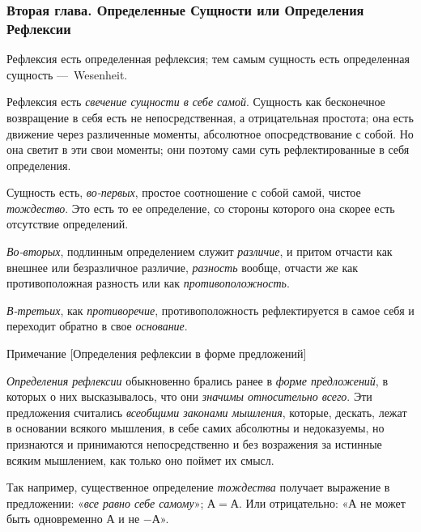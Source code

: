 \subsubsection{Вторая глава. Определенные Сущности или Определения Рефлексии}
Рефлексия есть определенная рефлексия; тем самым
сущность есть определенная сущность —~Wesenheit.

Рефлексия есть {\em свечение сущности в себе самой}.
Сущность как бесконечное возвращение в себя есть не непосредственная, а
отрицательная простота; она есть движение через различенные моменты,
абсолютное опосредствование с собой. Но она светит в эти свои моменты; они
поэтому сами суть рефлектированные в себя определения.

Сущность есть, {\em во-первых}, простое соотношение с
собой самой, чистое {\em тождество}. Это есть то ее
определение, со стороны которого она скорее есть отсутствие определений.

{\em Во-вторых}, подлинным определением служит
{\em различие}, и притом отчасти как внешнее или
безразличное различие, {\em разность} вообще, отчасти
же как противоположная разность или как
{\em противоположность}.

{\em В-третьих}, как
{\em противоречие}, противоположность рефлектируется в
самое себя и переходит обратно в свое {\em основание}.

{\centering
Примечание
[Определения рефлексии в форме предложений]
\par}

{\em Определения рефлексии} обыкновенно брались ранее в
{\em форме предложений}, в которых о них высказывалось,
что они {\em значимы относительно всего}. Эти
предложения считались {\em всеобщими законами
мышления}, которые, дескать, лежат в основании всякого мышления, в себе
самих абсолютны и недоказуемы, но признаются и принимаются непосредственно
и без возражения за истинные всяким мышлением, как только оно поймет их
смысл.

Так например, существенное определение {\em тождества}
получает выражение в предложении: «{\em все равно себе
самому}»; $А=А$. Или отрицательно: «$А$ не может
быть одновременно $А$ и не $-А$».

